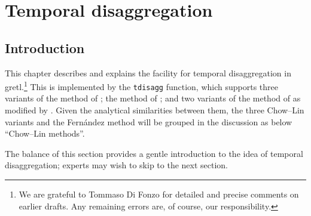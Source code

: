 \chapter{Temporal disaggregation}
\label{chap:tdisagg}

\newcommand{\Yb}{\mathbf{Y}}
\newcommand{\Xb}{\mathbf{X}}
\newcommand{\CXb}{\mathbf{CX}}
\newcommand{\Cb}{\mathbf{C}}
\newcommand{\Vb}{\mathbf{V}}
\newcommand{\Db}{\mathbf{D}}

\def\tditem[#1]#2{\item[{\tt #1}]#2}

\section{Introduction}
\label{sec:tdisagg-intro}

This chapter describes and explains the facility for temporal
disaggregation in gretl.\footnote{We are grateful to Tommaso Di Fonzo
for detailed and precise comments on earlier drafts. Any remaining
errors are, of course, our responsibility.} This is implemented by the
\texttt{tdisagg} function, which supports three variants of the method
of \cite{chowlin71}; the method of \cite{fernandez81}; and two
variants of the method of \cite{denton71} as modified by
\cite{cholette84}. Given the analytical similarities between them, the
three Chow--Lin variants and the Fern\'andez method will be grouped in
the discussion as below ``Chow--Lin methods''.

The balance of this section provides a gentle introduction to the idea
of temporal disaggregation; experts may wish to skip to the next
section.

